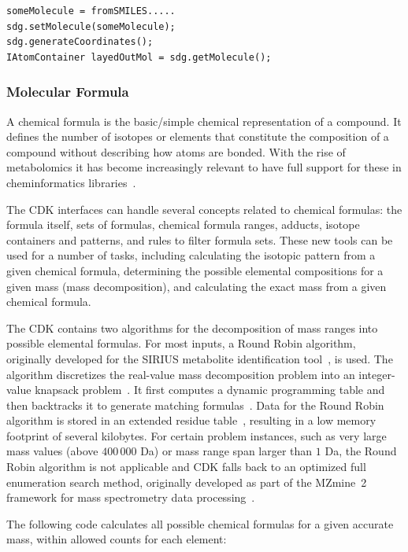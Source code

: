 \documentclass[10pt]{bmcart}
\begin{document}
\begin{verbatim}
someMolecule = fromSMILES.....
sdg.setMolecule(someMolecule);
sdg.generateCoordinates();
IAtomContainer layedOutMol = sdg.getMolecule();
\end{verbatim}


  \subsubsection*{Molecular Formula}

  A chemical formula is the basic/simple chemical representation of a compound.
It defines the number of isotopes or elements that constitute the composition
of a compound without describing how atoms are bonded. With the rise of
metabolomics it has become increasingly relevant to have full support for these
in cheminformatics libraries~\cite{RojasCherto2011}.

  The CDK interfaces can handle several concepts related to chemical formulas:
the formula itself, sets of formulas, chemical formula ranges, adducts, isotope
containers and patterns, and rules to filter formula sets. These new tools can
be used for a number of tasks, including calculating the isotopic pattern from
a given chemical formula, determining the possible elemental compositions for a
given mass (mass decomposition), and calculating the exact mass from a given
chemical formula.

  The CDK contains two algorithms for the decomposition of mass ranges into
possible elemental formulas. For most inputs, a Round Robin algorithm,
originally developed for the SIRIUS metabolite identification
tool~\cite{Bocker2009}, is used. The algorithm discretizes the real-value mass
decomposition problem into an integer-value knapsack
problem~\cite{Martello1990}. It first computes a dynamic programming table and
then backtracks it to generate matching formulas~\cite{Duehrkop2013,
Boecker2008}. Data for the Round Robin algorithm is stored in an extended
residue table~\cite{Bocker2005}, resulting in a low memory footprint of several
kilobytes. For certain problem instances, such as very large mass values (above
$400\,000$ Da) or mass range span larger than $1$ Da, the Round Robin algorithm
is not applicable and CDK falls back to an optimized full enumeration search
method, originally developed as part of the MZmine~2 framework for mass
spectrometry data processing~\cite{Pluskal2012, Pluskal2010}.

  The following code calculates all possible chemical formulas for a given
accurate mass, within allowed counts for each element:
\end{document}
